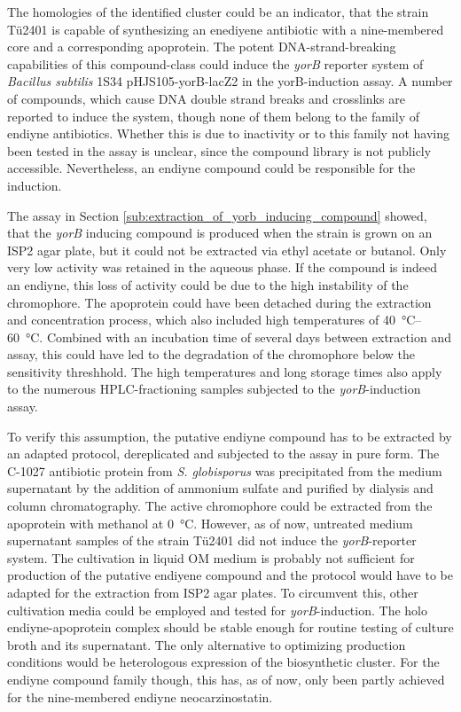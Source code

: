 	 The homologies of the identified cluster could be an indicator, that the strain Tü2401 is capable of synthesizing an enediyene antibiotic with a nine-membered core and a corresponding apoprotein.
	 The potent DNA-strand-breaking capabilities of this compound-class could induce the \textit{yorB} reporter system of \textit{Bacillus subtilis} 1S34 pHJS105-yorB-lacZ2 in the yorB-induction assay.
	 A number of compounds, which cause DNA double strand breaks and crosslinks are reported to induce the system, though none of them belong to the family of endiyne antibiotics.\autocite{Urban2007}
	 Whether this is due to inactivity or to this family not having been tested in the assay is unclear, since the compound library is not publicly accessible.
	 Nevertheless, an endiyne compound could be responsible for the induction.
	 
	 The assay in Section \ref{sub:extraction_of_yorb_inducing_compound} showed, that the \textit{yorB} inducing compound is produced when the strain is grown on an ISP2 agar plate, but it could not be extracted via ethyl acetate or butanol. Only very low activity was retained in the aqueous phase. If the compound is indeed an endiyne, this loss of activity could be due to the high instability of the chromophore. The apoprotein could have been detached during the extraction and concentration process, which also included high temperatures of \SIrange[range-units=single]{40}{60}{\celsius}. Combined with an incubation time of several days between extraction and assay, this could have led to the degradation of the chromophore below the sensitivity threshhold. The high temperatures and long storage times also apply to the numerous HPLC-fractioning samples subjected to the \textit{yorB}-induction assay. 
	 
	 To verify this assumption, the putative endiyne compound has to be extracted by an adapted protocol, dereplicated and subjected to the assay in pure form.
	 The C-1027 antibiotic protein from \textit{S. globisporus} was precipitated from the medium supernatant by the addition of ammonium sulfate and purified by dialysis and column chromatography.\autocite{Otani1988a}
	 The active chromophore could be extracted from the apoprotein with methanol at \SI{0}{\celsius}.\autocite{Matsumoto1993}
	 However, as of now, untreated medium supernatant samples of the strain Tü2401 did not induce the \textit{yorB}-reporter system.
	 The cultivation in liquid OM medium is probably not sufficient for production of the putative endiyene compound and the protocol would have to be adapted for the extraction from ISP2 agar plates.
	 To circumvent this, other cultivation media could be employed and tested for \textit{yorB}-induction.
	 The holo endiyne-apoprotein complex should be stable enough for routine testing of culture broth and its supernatant.
	 The only alternative to optimizing production conditions would be heterologous expression of the biosynthetic cluster.
	 For the endiyne compound family though, this has, as of now, only been partly achieved for the nine-membered endiyne neocarzinostatin.\autocite{Zhang2008}
	 
